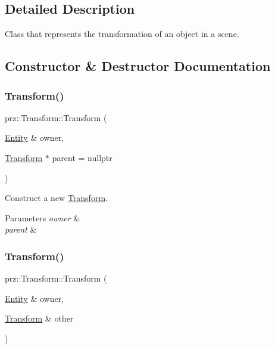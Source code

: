 \subsection{Detailed Description}
Class that represents the transformation of an object in a scene. 



\subsection{Constructor \& Destructor Documentation}
\mbox{\label{classprz_1_1_transform_a3728e8216215bccfd7585d364c2b2edd}} 
\subsubsection{\texorpdfstring{Transform()}{Transform()}\hspace{0.1cm}{\footnotesize\ttfamily [1/2]}}
{\footnotesize\ttfamily prz\+::\+Transform\+::\+Transform (\begin{DoxyParamCaption}\item[{\mbox{\hyperlink{classprz_1_1_entity}{Entity}} \&}]{owner,  }\item[{\mbox{\hyperlink{classprz_1_1_transform}{Transform}} $\ast$}]{parent = {\ttfamily nullptr} }\end{DoxyParamCaption})}



Construct a new \mbox{\hyperlink{classprz_1_1_transform}{Transform}}. 


\begin{DoxyParams}{Parameters}
{\em owner} & \\
\hline
{\em parent} & \\
\hline
\end{DoxyParams}
\mbox{\label{classprz_1_1_transform_af3a80de091cf1fb9871b735746be6714}} 
\subsubsection{\texorpdfstring{Transform()}{Transform()}\hspace{0.1cm}{\footnotesize\ttfamily [2/2]}}
{\footnotesize\ttfamily prz\+::\+Transform\+::\+Transform (\begin{DoxyParamCaption}\item[{\mbox{\hyperlink{classprz_1_1_entity}{Entity}} \&}]{owner,  }\item[{\mbox{\hyperlink{classprz_1_1_transform}{Transform}} \&}]{other }\end{DoxyParamCaption})}



